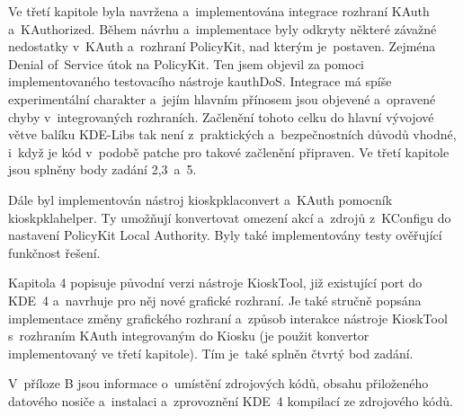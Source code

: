 Ve třetí kapitole byla navržena a~implementována integrace rozhraní KAuth a~KAuthorized. Během návrhu a~implementace byly odkryty některé závažné nedostatky v~KAuth a~rozhraní PolicyKit, nad kterým je~postaven. Zejména Denial of~Service útok na PolicyKit. Ten jsem objevil za pomoci implementovaného testovacího nástroje kauthDoS. Integrace má spíše experimentální charakter a~jejím hlavním přínosem jsou objevené a~opravené chyby v~integrovaných rozhraních. Začlenění tohoto celku do hlavní vývojové větve balíku KDE-Libs tak není z~praktických a~bezpečnostních důvodů vhodné, i~když je kód v~podobě patche pro takové začlenění připraven. Ve třetí kapitole jsou splněny body zadání 2,3~a~5.

Dále byl implementován nástroj kioskpklaconvert a~KAuth pomocník kioskpklahelper. Ty umožňují konvertovat omezení akcí a~zdrojů z~KConfigu do nastavení PolicyKit Local Authority. Byly také implementovány testy ověřující funkčnost řešení.

Kapitola 4 popisuje původní verzi nástroje KioskTool, již existující port do KDE~4 a~navrhuje pro něj nové grafické rozhraní. Je také stručně popsána implementace změny grafického rozhraní a~způsob interakce nástroje KioskTool s~rozhraním KAuth integrovaným do Kiosku (je použit konvertor implementovaný ve třetí kapitole). Tím je~také splněn čtvrtý bod zadání.

V~příloze B jsou informace o~umístění zdrojových kódů, obsahu přiloženého datového nosiče a~instalaci a~zprovoznění KDE~4 kompilací ze zdrojového kódů.

\appendix
